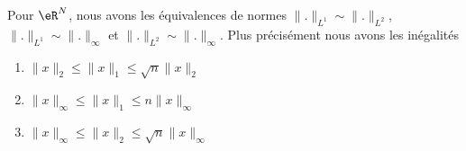 \begin{proposition} \label{PropLJEJooMOWPNi}
    Pour \( \eR^N\), nous avons les équivalences de normes $\| . \|_{L^1}\sim\| . \|_{L^2}$, $\| . \|_{L^1}\sim\| . \|_{\infty}$ et $\| . \|_{L^2}\sim\| . \|_{\infty}$. Plus précisément nous avons les inégalités
    \begin{enumerate}
        \item\label{ItemABSGooQODmLNi}
           $ \| x \|_2\leq \| x \|_1\leq\sqrt{n}\| x \|_2$
        \item\label{ItemABSGooQODmLNii}
            $\| x \|_{\infty}\leq \| x \|_1\leq n \| x \|_{\infty}$
        \item\label{ItemABSGooQODmLNiii}
            $\| x \|_{\infty}\leq \| x \|_2\leq \sqrt{n}\| x \|_{\infty}$
    \end{enumerate}
\end{proposition}



